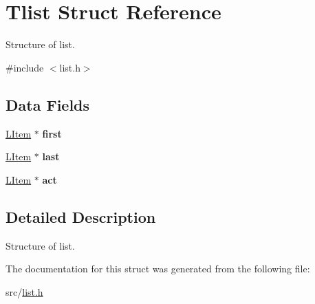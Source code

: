 \hypertarget{structTlist}{}\section{Tlist Struct Reference}
\label{structTlist}


Structure of list.  




{\ttfamily \#include $<$list.\+h$>$}

\subsection*{Data Fields}
\begin{DoxyCompactItemize}
\item 
\mbox{\label{structTlist_a4f74dc04f8a023e215ee1d2ccadd8d5f}} 
\hyperlink{list_8h_a29cf05fd2c5a415c8d20d06aa5e566b0}{L\+Item} $\ast$ {\bfseries first}
\item 
\mbox{\label{structTlist_a91a554a4699438feaa3dd92113c953ae}} 
\hyperlink{list_8h_a29cf05fd2c5a415c8d20d06aa5e566b0}{L\+Item} $\ast$ {\bfseries last}
\item 
\mbox{\label{structTlist_a7ac1539d6cdd3566943fe7afd19119c7}} 
\hyperlink{list_8h_a29cf05fd2c5a415c8d20d06aa5e566b0}{L\+Item} $\ast$ {\bfseries act}
\end{DoxyCompactItemize}


\subsection{Detailed Description}
Structure of list. 

The documentation for this struct was generated from the following file\+:\begin{DoxyCompactItemize}
\item 
src/\hyperlink{list_8h}{list.\+h}\end{DoxyCompactItemize}
